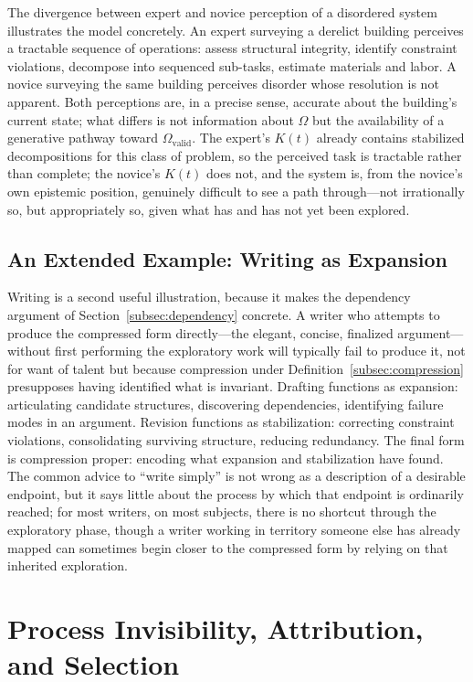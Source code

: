 \documentclass[12pt, a4paper]{article}
\theoremstyle{plain}
\theoremstyle{definition}
\theoremstyle{remark}
\begin{document}
The divergence between expert and novice perception of a disordered system illustrates the model concretely. An expert surveying a derelict building perceives a tractable sequence of operations: assess structural integrity, identify constraint violations, decompose into sequenced sub-tasks, estimate materials and labor. A novice surveying the same building perceives disorder whose resolution is not apparent. Both perceptions are, in a precise sense, accurate about the building's current state; what differs is not information about $\Omega$ but the availability of a generative pathway toward $\Omega_{\mathrm{valid}}$. The expert's $K(t)$ already contains stabilized decompositions for this class of problem, so the perceived task is tractable rather than complete; the novice's $K(t)$ does not, and the system is, from the novice's own epistemic position, genuinely difficult to see a path through---not irrationally so, but appropriately so, given what has and has not yet been explored.

\subsection{An Extended Example: Writing as Expansion}
\label{subsec:writing}

Writing is a second useful illustration, because it makes the dependency argument of Section~\ref{subsec:dependency} concrete. A writer who attempts to produce the compressed form directly---the elegant, concise, finalized argument---without first performing the exploratory work will typically fail to produce it, not for want of talent but because compression under Definition~\ref{subsec:compression} presupposes having identified what is invariant. Drafting functions as expansion: articulating candidate structures, discovering dependencies, identifying failure modes in an argument. Revision functions as stabilization: correcting constraint violations, consolidating surviving structure, reducing redundancy. The final form is compression proper: encoding what expansion and stabilization have found. The common advice to ``write simply'' is not wrong as a description of a desirable endpoint, but it says little about the process by which that endpoint is ordinarily reached; for most writers, on most subjects, there is no shortcut through the exploratory phase, though a writer working in territory someone else has already mapped can sometimes begin closer to the compressed form by relying on that inherited exploration.

\section{Process Invisibility, Attribution, and Selection}
\label{sec:invisibility}
\end{document}
